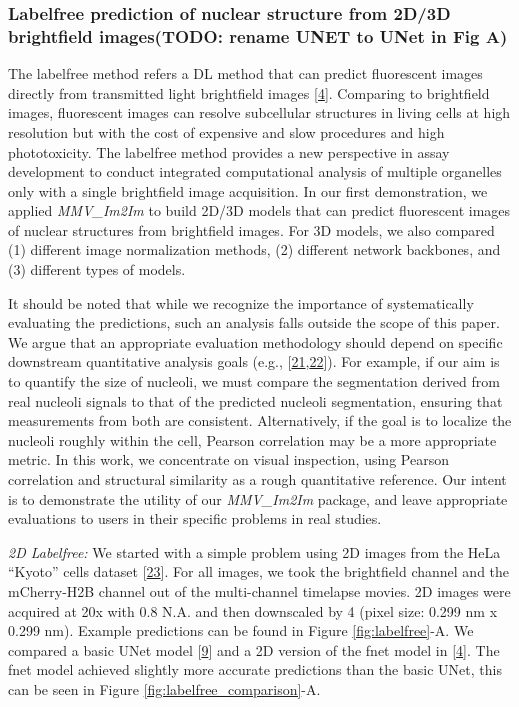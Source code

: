 \hypertarget{labelfree-prediction-of-nuclear-structure-from-2d3d-brightfield-imagestodo-rename-unet-to-unet-in-fig-a}{%
\subsubsection{Labelfree prediction of nuclear structure from 2D/3D brightfield images(TODO: rename UNET to UNet in Fig A)}\label{labelfree-prediction-of-nuclear-structure-from-2d3d-brightfield-imagestodo-rename-unet-to-unet-in-fig-a}}

The labelfree method refers a DL method that can predict fluorescent images directly from transmitted light brightfield images {[}\protect\hyperlink{ref-Yq8wZ6hc}{4}{]}. Comparing to brightfield images, fluorescent images can resolve subcellular structures in living cells at high resolution but with the cost of expensive and slow procedures and high phototoxicity. The labelfree method provides a new perspective in assay development to conduct integrated computational analysis of multiple organelles only with a single brightfield image acquisition. In our first demonstration, we applied \emph{MMV\_Im2Im} to build 2D/3D models that can predict fluorescent images of nuclear structures from brightfield images. For 3D models, we also compared (1) different image normalization methods, (2) different network backbones, and (3) different types of models.

It should be noted that while we recognize the importance of systematically evaluating the predictions, such an analysis falls outside the scope of this paper. We argue that an appropriate evaluation methodology should depend on specific downstream quantitative analysis goals (e.g., {[}\protect\hyperlink{ref-gPpwGUco}{21},\protect\hyperlink{ref-EOO2mf0p}{22}{]}). For example, if our aim is to quantify the size of nucleoli, we must compare the segmentation derived from real nucleoli signals to that of the predicted nucleoli segmentation, ensuring that measurements from both are consistent. Alternatively, if the goal is to localize the nucleoli roughly within the cell, Pearson correlation may be a more appropriate metric. In this work, we concentrate on visual inspection, using Pearson correlation and structural similarity as a rough quantitative reference. Our intent is to demonstrate the utility of our \emph{MMV\_Im2Im} package, and leave appropriate evaluations to users in their specific problems in real studies.

\emph{2D Labelfree:} We started with a simple problem using 2D images from the HeLa ``Kyoto'' cells dataset {[}\protect\hyperlink{ref-xv2VIyRP}{23}{]}. For all images, we took the brightfield channel and the mCherry-H2B channel out of the multi-channel timelapse movies. 2D images were acquired at 20x with 0.8 N.A. and then downscaled by 4 (pixel size: 0.299 nm x 0.299 nm). Example predictions can be found in Figure \ref{fig:labelfree}-A. We compared a basic UNet model {[}\protect\hyperlink{ref-TutLhFSz}{9}{]} and a 2D version of the fnet model in {[}\protect\hyperlink{ref-Yq8wZ6hc}{4}{]}. The fnet model achieved slightly more accurate predictions than the basic UNet, this can be seen in Figure \ref{fig:labelfree_comparison}-A.

